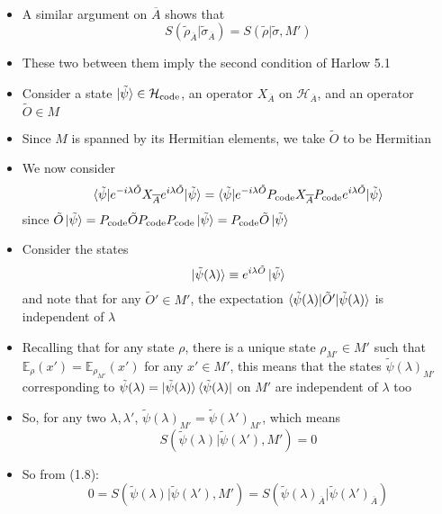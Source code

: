 \documentclass[12pt,a4paper]{article}
\numberwithin{equation}{section}
\newcommand{\ketbra}[2]{\ket{#1}\bra{#2}}
\newcommand{\ketbras}[1]{\ketbra{#1}{#1}}
\newcommand{\Pc}{P_{\text{code}}}
\newcommand{\Hcode}{\mathcal{H}_{\text{code}}}
\newcommand{\ol}[1]{\overline{#1}}
\theoremstyle{definition}
\theoremstyle{theorem}
\theoremstyle{example}
\begin{document}
\begin{itemize}
\begin{equation}
\begin{aligned}
			\end{aligned}
		\end{equation}
		\item A similar argument on $\overline{A}$ shows that
		\begin{equation}
			S(\tilde{\rho}_{\ol{A}}|\tilde{\sigma}_{\ol{A}})=S(\tilde{\rho}|\tilde{\sigma},M')
		\end{equation}
		\item These two between them imply the second condition of Harlow 5.1
		\item Consider a state $\ket{\tilde{\psi}}\in\Hcode$, an operator $X_{\ol{A}}$ on $\mathcal{H}_{\ol{A}}$, and an operator $\tilde{O}\in M$
		\item Since $M$ is spanned by its Hermitian elements, we take $\tilde{O}$ to be Hermitian
		\item We now consider
		\begin{equation}
			\braket{\tilde{\psi}|e^{-i\lambda\tilde{O}}X_{\ol{A}}e^{i\lambda\tilde{O}}|\tilde{\psi}}=\braket{\tilde{\psi}|e^{-i\lambda\tilde{O}}\Pc X_{\ol{A}}\Pc e^{i\lambda\tilde{O}}|\tilde{\psi}}
		\end{equation}
		since $\tilde{O}\ket{\tilde{\psi}}=\Pc\tilde{O}\Pc\Pc\ket{\tilde{\psi}}=\Pc\tilde{O}\ket{\tilde{\psi}}$
		\item Consider the states
		\begin{equation}
			\ket{\tilde{\psi}(\lambda)}\equiv e^{i\lambda\tilde{O}}\ket{\tilde{\psi}}
		\end{equation}
		and note that for any $\tilde{O}'\in M'$, the expectation $\braket{\tilde{\psi}(\lambda)|\tilde{O}'|\tilde{\psi}(\lambda)}$ is independent of $\lambda$
		\item Recalling that for any state $\rho$, there is a unique state $\rho_{M'}\in M'$ such that $\mathbb{E}_{\rho}(x')=\mathbb{E}_{\rho_{M'}}(x')$ for any $x'\in M'$, this means that the states $\tilde{\psi}(\lambda)_{M'}$ corresponding to  $\tilde{\psi}(\lambda)=\ketbras{\tilde{\psi}(\lambda)}$ on $M'$ are independent of $\lambda$ too
		\item So, for any two $\lambda,\lambda'$, $\tilde{\psi}(\lambda)_{M'}=\tilde{\psi}(\lambda')_{M'}$, which means
		\begin{equation}
			S(\tilde{\psi}(\lambda)|\tilde{\psi}(\lambda'),M')=0
		\end{equation}
		\item So from (1.8):
		\begin{equation}
			0=S(\tilde{\psi}(\lambda)|\tilde{\psi}(\lambda'),M')=S(\tilde{\psi}(\lambda)_{\ol{A}}|\tilde{\psi}(\lambda')_{\ol{A}})

\end{equation}
\end{itemize}
\end{document}
